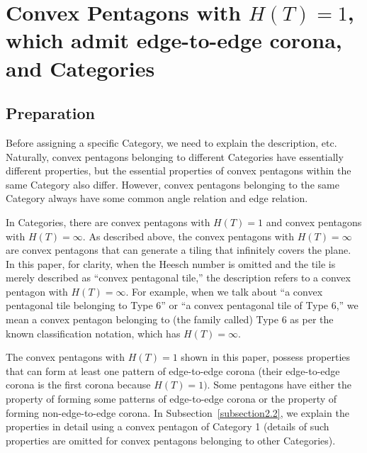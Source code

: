 \documentclass[11pt, a4paper]{article}
\begin{document}
\section{Convex Pentagons with $H(T) = 1$, which admit edge-to-edge corona, and 
Categories}
\label{section2}




\subsection{Preparation}
\label{subsection2.1}

Before assigning a specific Category, we need to explain the description, 
etc. Naturally, convex pentagons belonging to different Categories have 
essentially different properties, but the essential properties of convex 
pentagons within the same Category also differ. However, convex pentagons 
belonging to the same Category always have some common angle relation 
and edge relation.

In Categories, there are convex pentagons with $H(T) = 1$ and convex 
pentagons with $H(T) = \infty $. As described above, the convex pentagons 
with $H(T) = \infty $ are convex pentagons that can generate a tiling that 
infinitely covers the plane. In this paper, for clarity, when the Heesch 
number is omitted and the tile is merely described as ``convex pentagonal 
tile,'' the description refers to a convex pentagon with $H(T) = \infty $. 
For example, when we talk about ``a convex pentagonal tile belonging to Type 
6'' or ``a convex pentagonal tile of Type 6,'' we mean a convex pentagon 
belonging to (the family called) Type 6 as per the known classification 
notation, which has $H(T) = \infty $.

The convex pentagons with $H(T) = 1$ shown in this paper, possess properties 
that can form at least one pattern of edge-to-edge corona (their 
edge-to-edge corona is the first corona because $H(T) = 1)$. Some pentagons 
have either the property of forming some patterns of edge-to-edge corona or 
the property of forming non-edge-to-edge corona. In Subsection~\ref{subsection2.2}, 
we explain the properties in detail using a convex pentagon of Category 1 (details 
of such properties are omitted for convex pentagons belonging to other 
Categories).
\end{document}
